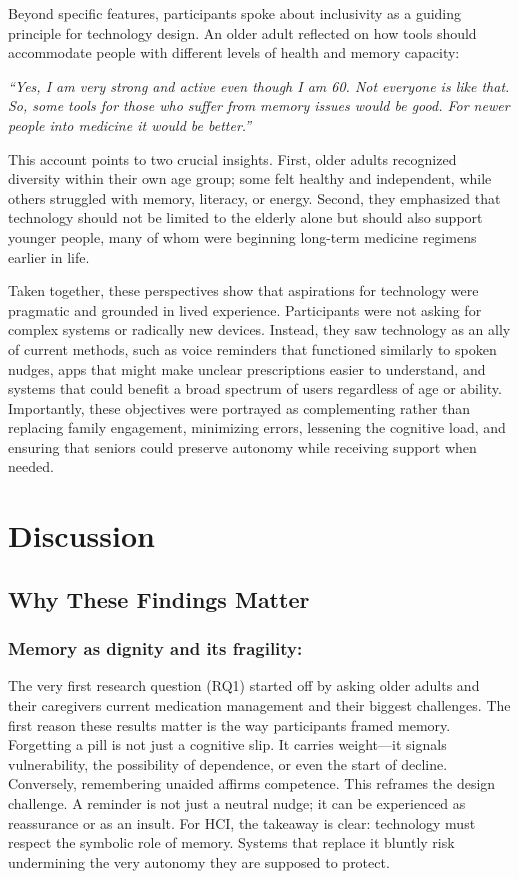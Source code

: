 \documentclass[acmlarge]{acmart}
\begin{document}
Beyond specific features, participants spoke about inclusivity as a
guiding principle for technology design. An older adult reflected on how
tools should accommodate people with different levels of health and
memory capacity:

\emph{``Yes, I am very strong and active even though I am 60. Not
everyone is like that. So, some tools for those who suffer from memory
issues would be good. For newer people into medicine it would be
better.''}

This account points to two crucial insights. First, older adults
recognized diversity within their own age group; some felt healthy and
independent, while others struggled with memory, literacy, or energy.
Second, they emphasized that technology should not be limited to the
elderly alone but should also support younger people, many of whom were
beginning long-term medicine regimens earlier in life.

Taken together, these perspectives show that aspirations for technology
were pragmatic and grounded in lived experience. Participants were not
asking for complex systems or radically new devices. Instead, they saw
technology as an ally of current methods, such as voice reminders that
functioned similarly to spoken nudges, apps that might make unclear
prescriptions easier to understand, and systems that could benefit a
broad spectrum of users regardless of age or ability. Importantly, these
objectives were portrayed as complementing rather than replacing family
engagement, minimizing errors, lessening the cognitive load, and
ensuring that seniors could preserve autonomy while receiving support
when needed.

\section{Discussion}
\subsection{Why These Findings Matter}
\subsubsection{Memory as dignity and its fragility: }
The very first research question (RQ1) started off by asking older
adults and their caregivers current medication management and their
biggest challenges. The first reason these results matter is the way
participants framed memory. Forgetting a pill is not just a cognitive
slip. It carries weight---it signals vulnerability, the possibility of
dependence, or even the start of decline. Conversely, remembering
unaided affirms competence. This reframes the design challenge. A
reminder is not just a neutral nudge; it can be experienced as
reassurance or as an insult\cite{10.1145/3154862.3154872}. For HCI, the takeaway is
clear: technology must respect the symbolic role of memory. Systems that
replace it bluntly risk undermining the very autonomy they are supposed
to protect\cite{10.1145/3544548.3580839}.
\end{document}
